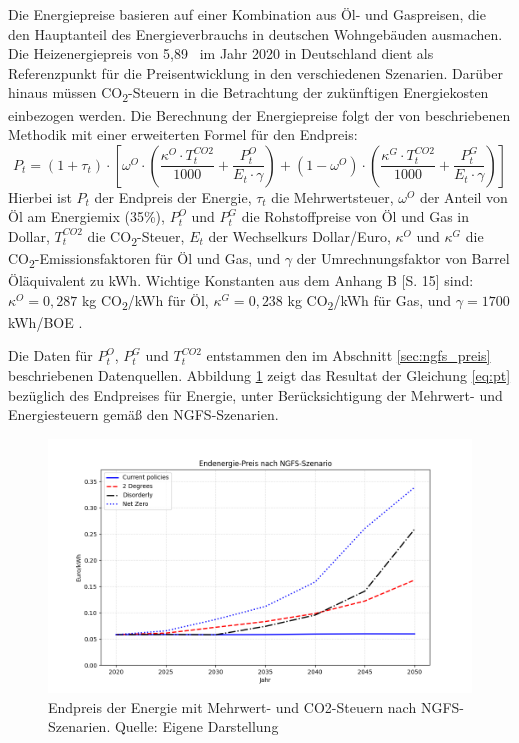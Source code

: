 Die Energiepreise basieren auf einer Kombination aus Öl- und Gaspreisen, die den Hauptanteil des Energieverbrauchs in deutschen Wohngebäuden ausmachen. Die Heizenergiepreis von 5,89~ im Jahr 2020 in Deutschland \parencite{behr2023warmemonitor} dient als Referenzpunkt für die Preisentwicklung in den verschiedenen Szenarien. Darüber hinaus müssen CO\textsubscript{2}-Steuern in die Betrachtung der zukünftigen Energiekosten einbezogen werden. Die Berechnung der Energiepreise folgt der von \textcite{tergerman} beschriebenen Methodik mit einer erweiterten Formel für den Endpreis:
\begin{equation}\label{eq:pt}
P_t = (1 + \tau_t) \cdot [\omega^O \cdot (\frac{\kappa^O \cdot T^{CO2}_t}{1000} + \frac{P^O_t}{E_t \cdot \gamma}) + (1 - \omega^O) \cdot (\frac{\kappa^G \cdot T^{CO2}_t}{1000} + \frac{P^G_t}{E_t \cdot \gamma})]
\end{equation}
Hierbei ist $P_t$ der Endpreis der Energie, $\tau_t$ die Mehrwertsteuer, $\omega^O$ der Anteil von Öl am Energiemix (35\%), $P^O_t$ und $P^G_t$ die Rohstoffpreise von Öl und Gas in Dollar, $T^{CO2}_t$ die CO\textsubscript{2}-Steuer, $E_t$ der Wechselkurs Dollar/Euro, $\kappa^O$ und $\kappa^G$ die CO\textsubscript{2}-Emissionsfaktoren für Öl und Gas, und $\gamma$ der Umrechnungsfaktor von Barrel Öläquivalent zu kWh. Wichtige Konstanten aus dem Anhang B [S. 15] sind: $\kappa^O = 0,287$ kg CO\textsubscript{2}/kWh für Öl, $\kappa^G = 0,238$ kg CO\textsubscript{2}/kWh für Gas, und $\gamma = 1700$ kWh/BOE \parencite{tergerman}. 

Die Daten für $P^O_t$, $P^G_t$ und $T^{CO2}_t$ entstammen den im Abschnitt \ref{sec:ngfs_preis} beschriebenen Datenquellen.
Abbildung \ref{fig:endpreis_energie} zeigt das Resultat der Gleichung \ref{eq:pt} bezüglich des Endpreises für Energie, unter Berücksichtigung der Mehrwert- und Energiesteuern gemäß den NGFS-Szenarien.

\begin{figure}[htbp]
    \centering
    \includegraphics[width=\textwidth]{figures/endpreis.png}
    \caption{Endpreis der Energie mit Mehrwert- und CO2-Steuern nach NGFS-Szenarien. Quelle: Eigene Darstellung}
    \label{fig:endpreis_energie}
\end{figure}
\FloatBarrier
